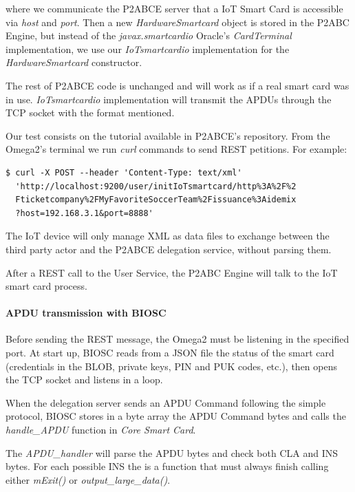where we communicate the P2ABCE server that a IoT Smart Card is accessible via \textit{host} and \textit{port}. Then a new \textit{HardwareSmartcard} object is stored in the P2ABC Engine, but instead of the \textit{javax.smartcardio} Oracle's \textit{CardTerminal} implementation, we use our \textit{IoTsmartcardio} implementation for the \textit{HardwareSmartcard} constructor.

The rest of P2ABCE code is unchanged and will work as if a real smart card was in use. \textit{IoTsmartcardio} implementation will transmit the APDUs through the TCP socket with the format mentioned.


\hfil

Our test consists on the tutorial available in P2ABCE's repository. From the Omega2's terminal we run \textit{curl} commands to send REST petitions. For example:

\begin{verbatim}
$ curl -X POST --header 'Content-Type: text/xml'
  'http://localhost:9200/user/initIoTsmartcard/http%3A%2F%2
  Fticketcompany%2FMyFavoriteSoccerTeam%2Fissuance%3Aidemix
  ?host=192.168.3.1&port=8888'
\end{verbatim}

The IoT device will only manage XML as data files to exchange between the third party actor and the P2ABCE delegation service, without parsing them.

After a REST call to the User Service, the P2ABC Engine will talk to the IoT smart card process.

\paragraph{APDU transmission with BIOSC}


Before sending the REST message, the Omega2 must be listening in the specified port. At start up, BIOSC reads from a JSON file the status of the smart card (credentials in the BLOB, private keys, PIN and PUK codes, etc.), then opens the TCP socket and listens in a loop.

When the delegation server sends an APDU Command following the simple protocol, BIOSC stores in a byte array the APDU Command bytes and calls the \textit{handle\_APDU} function in \textit{Core Smart Card}.


The \textit{APDU\_handler} will parse the APDU bytes and check both CLA and INS bytes. For each possible INS the is a function that must always finish calling either \textit{mExit()} or \textit{output\_large\_data()}.

